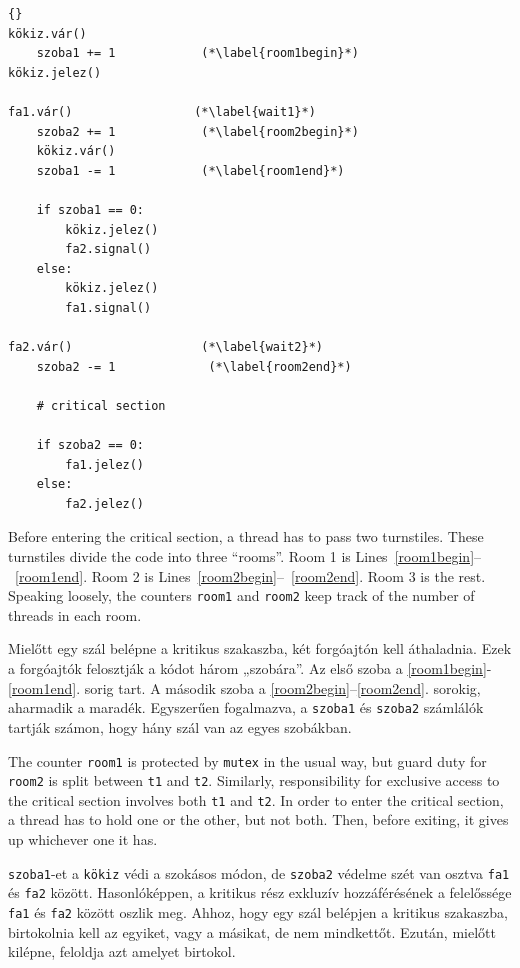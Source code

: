 \documentclass{book}
\begin{document}
\begin{lstlisting}[title={Morris algoritmusa}]{}
kökiz.vár()
    szoba1 += 1            (*\label{room1begin}*)
kökiz.jelez()
                           
fa1.vár()                 (*\label{wait1}*)
    szoba2 += 1            (*\label{room2begin}*)
    kökiz.vár()
    szoba1 -= 1            (*\label{room1end}*)

    if szoba1 == 0: 
        kökiz.jelez()
        fa2.signal()
    else: 
        kökiz.jelez()
        fa1.signal()

fa2.vár()                  (*\label{wait2}*)
    szoba2 -= 1             (*\label{room2end}*)

    # critical section

    if szoba2 == 0:
        fa1.jelez()
    else:
        fa2.jelez()
\end{lstlisting}

Before entering the critical section, a thread has to pass two
turnstiles.  These turnstiles divide the code into three ``rooms''.
Room 1 is Lines~\ref{room1begin}--~\ref{room1end}.  Room 2 is
Lines~\ref{room2begin}--~\ref{room2end}.  Room 3 is the rest.
Speaking loosely, the counters {\tt room1} and {\tt room2} keep track
of the number of threads in each room.

Mielőtt egy szál belépne a kritikus szakaszba, két forgóajtón kell áthaladnia.
Ezek a forgóajtók felosztják a kódot három „szobára”. Az első szoba a \ref{room1begin}-\ref{room1end}. sorig tart.
A második szoba a \ref{room2begin}–\ref{room2end}. sorokig, aharmadik a maradék. Egyszerűen
fogalmazva, a {\tt szoba1} és {\tt szoba2} számlálók tartják számon, hogy hány szál van az
egyes szobákban.

The counter {\tt room1} is protected by {\tt mutex} in the usual way,
but guard duty for {\tt room2} is split between {\tt t1} and {\tt t2}.
Similarly, responsibility for exclusive access to the critical section
involves both {\tt t1} and {\tt t2}.  In order to enter the critical
section, a thread has to hold one or the other, but not both.  Then,
before exiting, it gives up whichever one it has.

{\tt szoba1}-et a {\tt kökiz} védi a szokásos módon, de {\tt szoba2} védelme
szét van osztva {\tt fa1} és {\tt fa2} között. Hasonlóképpen, a kritikus rész exkluzív hozzáférésének
a felelőssége {\tt fa1} és {\tt fa2} között oszlik meg. Ahhoz, hogy egy szál belépjen a kritikus szakaszba,
birtokolnia kell az egyiket, vagy a másikat, de nem mindkettőt.
Ezután, mielőtt kilépne, feloldja azt amelyet birtokol.
\end{document}
